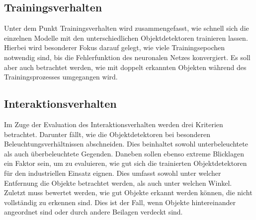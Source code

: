 \subsection*{Trainingsverhalten}

Unter dem Punkt Trainingsverhalten wird zusammengefasst, wie schnell sich die einzelnen Modelle mit den unterschiedlichen Objektdetektoren trainieren lassen. Hierbei wird besonderer Fokus darauf gelegt, wie viele Trainingsepochen notwendig sind, bis die Fehlerfunktion des neuronalen Netzes konvergiert. Es soll aber auch betrachtet werden, wie mit doppelt erkannten Objekten während des Trainingsprozesses umgegangen wird. 

\subsection*{Interaktionsverhalten}

Im Zuge der Evaluation des Interaktionsverhalten werden drei Kriterien betrachtet. Darunter fällt, wie die Objektdetektoren bei besonderen Beleuchtungsverhältnissen abschneiden. Dies beinhaltet sowohl unterbeleuchtete als auch überbeleuchtete Gegenden. Daneben sollen ebenso extreme Blicklagen ein Faktor sein, um zu evaluieren, wie gut sich die trainierten Objektdetektoren für den industriellen Einsatz eignen. Dies umfasst sowohl unter welcher Entfernung die Objekte betrachtet werden, als auch unter welchen Winkel. Zuletzt muss bewertet werden, wie gut Objekte erkannt werden können, die nicht vollständig zu erkennen sind. Dies ist der Fall, wenn Objekte hintereinander angeordnet sind oder durch andere Beilagen verdeckt sind. 
